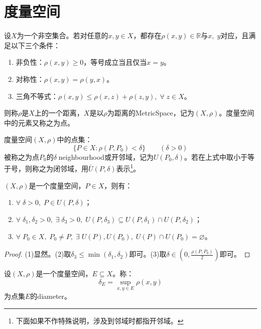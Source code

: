 \chapter{度量空间}

\begin{definition}
	设$X$为一个非空集合。若对任意的$x,y\in X$，都存在$\rho(x,y)\in\mathbb{R}$与$x,\;y$对应，且满足以下三个条件：
	\begin{enumerate}
		\item 非负性：$\rho(x,y)\geqslant0$，等号成立当且仅当$x=y$。
		\item 对称性：$\rho(x,y)=\rho(y,x)$。
		\item 三角不等式：$\rho(x,y)\leqslant\rho(x,z)+\rho(z,y),\;\forall\;z\in X$。
	\end{enumerate}
	则称$\rho$是$X$上的一个距离，$X$是以$\rho$为距离的\gls{MetricSpace}，记为$(X,\rho)$。度量空间中的元素又称之为点。
\end{definition}
\begin{definition}
	度量空间$(X,\rho)$中的点集：
	\begin{equation*}
		\{P\in X:\rho(P,P_0)<\delta\}\qquad (\delta>0)
	\end{equation*}
	被称之为点$P_0$的$\delta\;$\gls{neighbourhood}或开邻域，记为$U(P_0,\delta)$。若在上式中取小于等于号，则称之为闭邻域，用$\bar{U}(P,\delta)$表示\footnote{下面如果不作特殊说明，涉及到邻域时都指开邻域。}。
\end{definition}
\begin{property}\label{prop:Neighbourhood}
	$(X,\rho)$是一个度量空间，$P\in X$，则有：
	\begin{enumerate}
		\item $\forall\;\delta>0,\;P\in U(P,\delta)$；
		\item $\forall\;\delta_1,\delta_2>0,\;\exists\;\delta_3>0,\;U(P,\delta_3)\subseteq U(P,\delta_1)\cap U(P,\delta_2)$；
		\item $\forall\;P_0\in X,\;P_0\ne P,\;\exists\;U(P),U(P_0),\;U(P)\cap U(P_0)=\varnothing$。
	\end{enumerate}
\end{property}
\begin{proof}
	(1)显然。(2)取$\delta_3\leqslant\min(\delta_1,\delta_2)$即可。(3)取$\delta\in\left(0,\frac{\rho(P,P_0)}{2}\right)$即可。
\end{proof}
\begin{definition}
	设$(X,\rho)$是一个度量空间，$E\subseteq X$。称：
	\begin{equation*}
		\delta_E=\sup_{x,y\in E}\rho(x,y)
	\end{equation*}
	为点集$E$的\gls{diameter}。
\end{definition}
